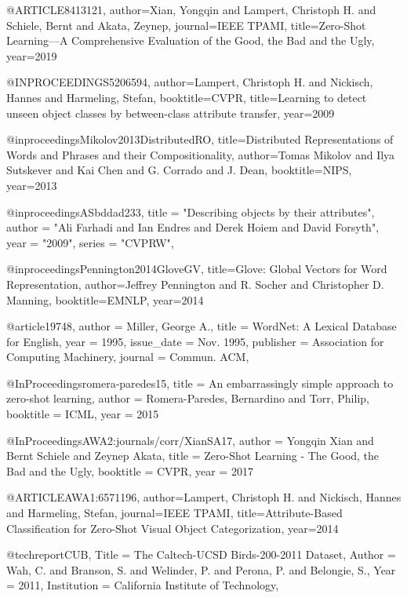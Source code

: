 @ARTICLE{8413121, 
author={Xian, Yongqin and Lampert, Christoph H. and Schiele, Bernt and Akata, Zeynep},  journal={IEEE TPAMI},   title={Zero-Shot Learning—A Comprehensive Evaluation of the Good, the Bad and the Ugly},   year={2019}}

@INPROCEEDINGS{5206594,  author={Lampert, Christoph H. and Nickisch, Hannes and Harmeling, Stefan},  booktitle={CVPR},   title={Learning to detect unseen object classes by between-class attribute transfer},   year={2009}}


@inproceedings{Mikolov2013DistributedRO,
  title={Distributed Representations of Words and Phrases and their Compositionality},
  author={Tomas Mikolov and Ilya Sutskever and Kai Chen and G. Corrado and J. Dean},
  booktitle={NIPS},
  year={2013}
}


@inproceedings{ASbddad233,
title = "Describing objects by their attributes",
author = "Ali Farhadi and Ian Endres and Derek Hoiem and David Forsyth",
year = "2009",
series = "CVPRW",
}



@inproceedings{Pennington2014GloveGV,
  title={Glove: Global Vectors for Word Representation},
  author={Jeffrey Pennington and R. Socher and Christopher D. Manning},
  booktitle={EMNLP},
  year={2014}
}

@article{19748,
author = {Miller, George A.},
title = {WordNet: A Lexical Database for English},
year = {1995},
issue_date = {Nov. 1995},
publisher = {Association for Computing Machinery},
journal = {Commun. ACM},
}



@InProceedings{romera-paredes15,
  title = 	 {An embarrassingly simple approach to zero-shot learning},
  author = 	 {Romera-Paredes, Bernardino and Torr, Philip},
  booktitle = {ICML},
  year = {2015}
}


@InProceedings{AWA2:journals/corr/XianSA17,
  author    = {Yongqin Xian and
               Bernt Schiele and
               Zeynep Akata},
  title     = {Zero-Shot Learning - The Good, the Bad and the Ugly},
  booktitle   = {CVPR},
  year      = {2017}
}

@ARTICLE{AWA1:6571196,  author={Lampert, Christoph H. and Nickisch, Hannes and Harmeling, Stefan},  journal={IEEE TPAMI},   title={Attribute-Based Classification for Zero-Shot Visual Object Categorization},   year={2014}}




@techreport{CUB,
	Title = {{The Caltech-UCSD Birds-200-2011 Dataset}},
	Author = {Wah, C. and Branson, S. and Welinder, P. and Perona, P. and Belongie, S.},
	Year = {2011},
	Institution = {California Institute of Technology},
}

